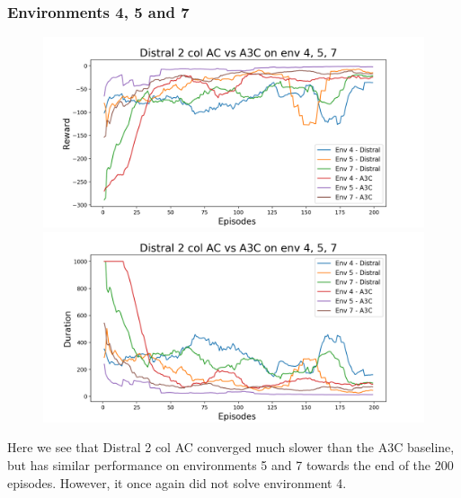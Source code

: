 \documentclass[12pt]{report}
\begin{document}
\subsubsection{Environments 4, 5 and 7}
\begin{figure}[H]
\centering
\begin{minipage}{.5\textwidth}
\centering
\includegraphics[width=\textwidth]{figs/d2_col_ac/d2_col_ac_4_5_7_rwd.png}
\end{minipage}%
\centering
\begin{minipage}{.5\textwidth}
\centering
\includegraphics[width=\textwidth]{figs/d2_col_ac/d2_col_ac_4_5_7_dur.png}
\end{minipage}%
\end{figure}
Here we see that Distral 2 col AC converged much slower than the A3C baseline, but has similar performance on environments 5 and 7 towards the end of the 200 episodes. However, it once again did not solve environment 4.
\end{document}
